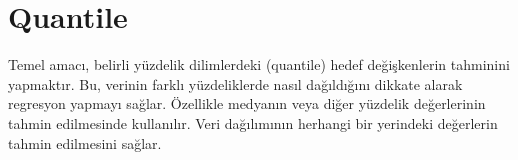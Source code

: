 \section{Quantile}
Temel amacı, belirli yüzdelik dilimlerdeki (quantile) hedef değişkenlerin tahminini yapmaktır. Bu, verinin farklı yüzdeliklerde nasıl dağıldığını dikkate alarak regresyon yapmayı sağlar. Özellikle medyanın veya diğer yüzdelik değerlerinin tahmin edilmesinde kullanılır. Veri dağılımının herhangi bir yerindeki değerlerin tahmin edilmesini sağlar.

\newpage